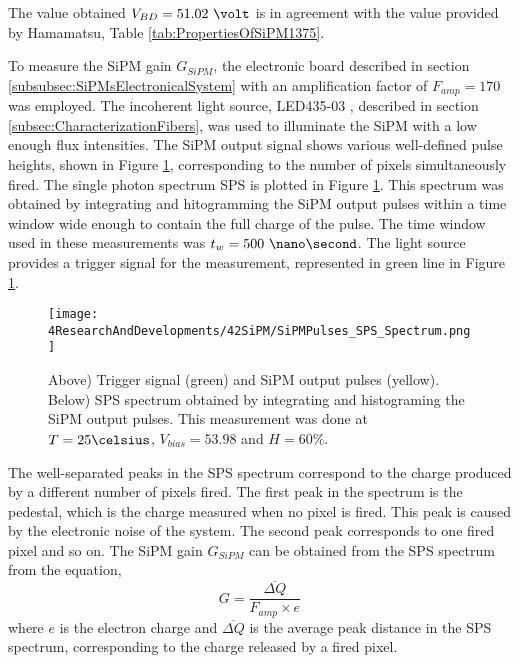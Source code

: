 The value obtained $V_{BD}=51.02~\volt$ is in agreement with the value provided by Hamamatsu, Table \ref{tab:PropertiesOfSiPM1375}.

To measure the SiPM gain $G_{SiPM}$, the electronic board described in section \ref{subsubsec:SiPMsElectronicalSystem} with an amplification factor of $F_{amp}=170$ was employed. The incoherent light source, LED435-03 \cite{LEDRLT}, described in section \ref{subsec:CharacterizationFibers}, was used to illuminate the SiPM with a low enough flux intensities. The SiPM output signal shows various well-defined pulse heights, shown in Figure \ref{fig:OutputPulses_SPSspectrum}, corresponding to the number of pixels simultaneously fired. The single photon spectrum SPS is plotted in Figure \ref{fig:OutputPulses_SPSspectrum}. This spectrum was obtained by integrating and hitogramming the SiPM output pulses within a time window wide enough to contain the full charge of the pulse. The time window used in these measurements was $t_w= 500~\nano\second$. The light source provides a trigger signal for the measurement, represented in green line in Figure \ref{fig:OutputPulses_SPSspectrum}.
\begin{figure}[hbtp]
\centering
\texttt{[image: 4ResearchAndDevelopments/42SiPM/SiPMPulses\_SPS\_Spectrum.png]}
\caption{Above) Trigger signal (green) and SiPM output pulses (yellow). Below) SPS spectrum obtained by integrating and histograming the SiPM output pulses. This measurement was done at $T=25\celsius$, $V_{bias}=53.98$ and $H=60\%$. \label{fig:OutputPulses_SPSspectrum}}
\end{figure}
The well-separated peaks in the SPS spectrum correspond to the charge produced by a different number of pixels fired. The first peak in the spectrum is the pedestal, which is the charge measured when no pixel is fired. This peak is caused by the electronic noise of the system. The second peak corresponds to one fired pixel and so on. The SiPM gain $G_{SiPM}$ can be obtained from the SPS spectrum from the equation,
\begin{equation}
G=\frac{\overline{\Delta Q}}{F_{amp} \times e}
\label{SiPMGain}
\end{equation}
where $e$ is the electron charge and $\overline{\Delta Q}$ is the average peak distance in the SPS spectrum, corresponding to the charge released by a fired pixel. 

